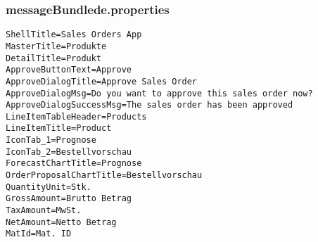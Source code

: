 \subsubsection*{messageBundle\textunderscore de.properties}
\begin{lstlisting}[frame=htrbl, label=lst:messageBundleDE.properties]
ShellTitle=Sales Orders App
MasterTitle=Produkte
DetailTitle=Produkt
ApproveButtonText=Approve
ApproveDialogTitle=Approve Sales Order
ApproveDialogMsg=Do you want to approve this sales order now?
ApproveDialogSuccessMsg=The sales order has been approved
LineItemTableHeader=Products
LineItemTitle=Product
IconTab_1=Prognose
IconTab_2=Bestellvorschau
ForecastChartTitle=Prognose
OrderProposalChartTitle=Bestellvorschau
QuantityUnit=Stk.
GrossAmount=Brutto Betrag
TaxAmount=MwSt.
NetAmount=Netto Betrag
MatId=Mat. ID

\end{lstlisting}
